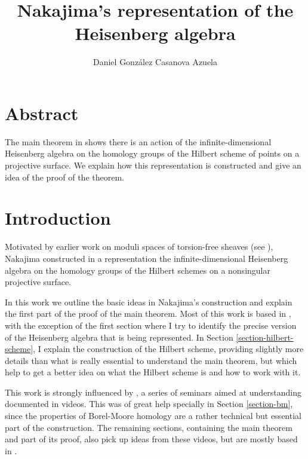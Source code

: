 
\usepackage{graphicx}
\usepackage{url}



\title{Nakajima's representation of the
Heisenberg algebra}
\author{Daniel González Casanova Azuela}

\maketitle

\label{section-phantom}

\section*{Abstract}
\label{section-abs}

\noindent
The main theorem in \cite{Nakajima-Heis}
shows there is an action of the
infinite-dimensional
Heisenberg algebra
on the homology groups of the Hilbert
scheme of points on a projective surface.
We explain how this representation is
constructed
and give an idea of the proof of the theorem.



\tableofcontents

\section{Introduction}
\label{section-intro}

\noindent
Motivated by earlier work on moduli spaces
of
torsion-free sheaves
(see \cite{Nakajima-ALE}),
Nakajima constructed in \cite{Nakajima-Heis}
a representation the infinite-dimensional
Heisenberg
algebra on the homology groups of the
Hilbert schemes
on a nonsingular projective surface.

In this work we outline the basic ideas in
Nakajima's construction
and explain the first part of the proof of
the main theorem.
Most of this work is based in
\cite{Nakajima-lectures},
with the exception of the first section
where I try to identify the precise version
of the Heisenberg
algebra that is being represented.
In Section \ref{section-hilbert-scheme},
I explain the construction of the Hilbert
scheme,
providing slightly more details than what is
really essential
to understand the main theorem,
but which help to get a better idea on what
the Hilbert scheme is
and how to work with it.

This work is strongly influenced by
\cite{videos},
a series of seminars aimed at understanding
\cite{Nakajima-lectures}
documented in videos.
This was of great help
specially in Section \ref{section-bm}, since
the properties of Borel-Moore homology are a
rather technical
but essential part of the construction.
The remaining sections, containing the main
theorem
and part of its proof,
also pick up ideas from these videos,
but are mostly based in
\cite{Nakajima-lectures}.


